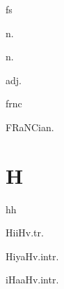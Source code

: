 \begin{multicols*}{2}
\begin{dictroot}{f}{s}
    \begin{dictentry}{}{n.}
    \end{dictentry}
    \begin{dictentry}{}{n.}
    \end{dictentry}
    \begin{dictentry}{}{adj.}
    \end{dictentry}
\end{dictroot}

\begin{dictroot}{fr}{nc}
    \begin{dictentry}{FRaNCia}{n.}
    \end{dictentry}
\end{dictroot}

\section*{H}

\begin{dictroot}{h}{h}
    \begin{dictentry}{HiiH}{v.tr.}
    \end{dictentry}
    \begin{dictentry}{HiyaH}{v.intr.}
    \end{dictentry}
    \begin{dictentry}{iHaaH}{v.intr.}
    \end{dictentry}
\end{dictroot}


\end{multicols*}
